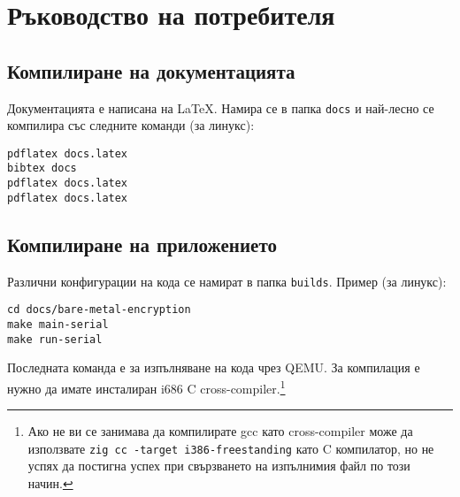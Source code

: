 \section{Ръководство на потребителя}
\subsection{Компилиране на документацията}
Документацията е написана на \LaTeX{}. Намира се в папка {\tt docs} и най-лесно се компилира със следните команди (за линукс):
\begin{lstlisting}
pdflatex docs.latex
bibtex docs
pdflatex docs.latex
pdflatex docs.latex
\end{lstlisting}

\subsection{Компилиране на приложението}
Различни конфигурации на кода се намират в папка {\tt builds}. Пример (за линукс):
\begin{lstlisting}
cd docs/bare-metal-encryption
make main-serial
make run-serial
\end{lstlisting}
Последната команда е за изпълняване на кода чрез QEMU. За компилация е нужно да имате инсталиран i686 C cross-compiler.\footnote{Ако не ви се занимава да компилирате gcc като cross-compiler може да използвате {\tt zig cc -target i386-freestanding} като C компилатор, но не успях да постигна успех при свързването на изпълнимия файл по този начин.}

